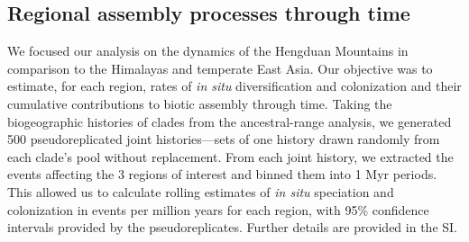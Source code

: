 \subsection{Regional assembly processes through time}

We focused our analysis on the dynamics of the Hengduan Mountains in comparison to the Himalayas and temperate East Asia. Our objective was to estimate, for each region, rates of \textit{in situ} diversification and colonization and their cumulative contributions to biotic assembly through time. Taking the biogeographic histories of clades from the ancestral-range analysis, we generated 500 pseudoreplicated joint histories---sets of one history drawn randomly from each clade's pool without replacement. From each joint history, we extracted the events affecting the 3 regions of interest and binned them into 1 Myr periods. This allowed us to calculate rolling estimates of \textit{in situ} speciation and colonization in events per million years for each region, with 95\% confidence intervals provided by the pseudoreplicates. Further details are provided in the SI.